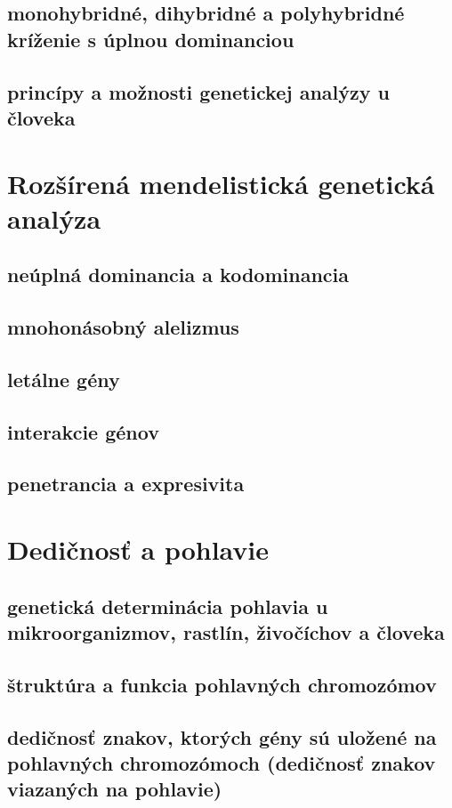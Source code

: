 \subsection*{monohybridné, dihybridné a polyhybridné kríženie s úplnou dominanciou}
\subsection*{princípy a možnosti genetickej analýzy u človeka}

\section{Rozšírená mendelistická genetická analýza}
\subsection*{neúplná dominancia a kodominancia}
\subsection*{mnohonásobný alelizmus}
\subsection*{letálne gény}
\subsection*{interakcie génov}
\subsection*{penetrancia a expresivita}

\section{Dedičnosť a pohlavie}
\subsection*{genetická determinácia pohlavia u mikroorganizmov, rastlín, živočíchov a človeka}
\subsection*{štruktúra a funkcia pohlavných chromozómov}
\subsection*{dedičnosť znakov, ktorých gény sú uložené na pohlavných chromozómoch (dedičnosť znakov viazaných na pohlavie)}
